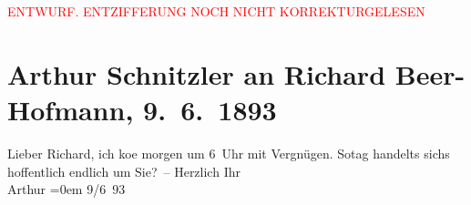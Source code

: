 
\begin{center}
            \textcolor{red}{ENTWURF. ENTZIFFERUNG NOCH NICHT KORREKTURGELESEN}
                      \end{center}
            
               \section[Arthur Schnitzler an Richard Beer-Hofmann, 9. 6. 1893]{ Arthur Schnitzler an Richard Beer-Hofmann, 9. 6. 1893}\nopagebreak{}\rehead{ }\begin{ledgroupsized}[t]{13cm}\normalsize\beginnumbering{} \toendnotes[C]{\smallbreak\pagebreak[2]} 
\pstart
           \noindent{}{\pb}Lieber Richard, ich ko{\geminationm}e morgen um 6 Uhr mit Vergnügen.
                     So{\geminationn}tag handelts sichs hoffentlich
               endlich um Sie? –\pend
           \pstart
           Herzlich Ihr{\\[\baselineskip]}\spacefill\mbox{Arthur}\pend
           \leftskip=0em{}\pstart
           \raggedleft{}9/6 93\pend
           \endnumbering{}\end{ledgroupsized}  \newcommand{\dateiname}{L00219}\newcommand{\titel}{Arthur Schnitzler an Richard Beer-Hofmann, 9. 6. 1893}\newcommand{\editorInnen}{Martin Anton Müller und Gerd-Hermann Susen}
      